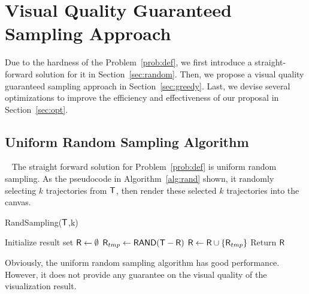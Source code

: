\section{Visual Quality Guaranteed Sampling Approach}
Due to the hardness of the Problem~\ref{prob:def}, we first introduce a straight-forward solution for it in Section~\ref{sec:random}.
Then, we propose a visual quality guaranteed sampling approach in Section~\ref{sec:greedy}.
Last, we devise several optimizations to improve the efficiency and effectiveness of our proposal in Section~\ref{sec:opt}.


\subsection{Uniform Random Sampling Algorithm}~\label{sec:random}
The straight forward solution for Problem~\ref{prob:def} is uniform random sampling.
As the pseudocode in Algorithm~\ref{alg:rand} shown, it randomly selecting $k$ trajectories from $\mathsf{T}$, then render these selected $k$ trajectories into the canvas.

\begin{algorithm}
    \caption{RandSampling($\mathsf{T}$,k)} \label{alg:rand}
    \begin{algorithmic}[1]
    \State Initialize result set $\mathsf{R} \leftarrow \emptyset$
        \State $\mathsf{R}_{tmp} \leftarrow \mathsf{RAND(\mathsf{T}-\mathsf{R})}$
        \State $\mathsf{R} \leftarrow \mathsf{R} \cup \{ \mathsf{R}_{tmp} \}$
    \EndWhile
    \State Return $\mathsf{R}$
    \end{algorithmic}
\end{algorithm}

Obviously, the uniform random sampling algorithm has good performance.
However, it does not provide any guarantee on the visual quality of the visualization result.




